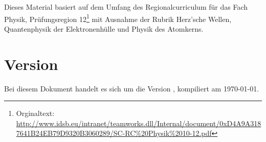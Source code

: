 Dieses Material basiert auf dem Umfang des \glqq Regionalcurriculum für das Fach Physik, Prüfungsregion 12\grqq{}\footnote{Orginaltext: \url{http://www.idsb.eu/intranet/teamworks.dll/Internal/document/0xD4A9A3187641B24EB79D9320B3060289/SC-RC\%20Physik\%2010-12.pdf}} mit Ausnahme der Rubrik \glqq Herz'sche Wellen\grqq , \glqq Quantenphysik der Elektronenhülle\grqq{} und \glqq Physik des Atomkerns\grqq .


\section*{Version}

Bei diesem Dokument handelt es sich um die Version \version , kompiliert am \today .